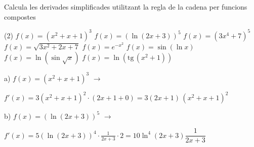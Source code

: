 \begin{mylist}
\exer[1] Calcula les derivades simplificades utilitzant la regla de la cadena per funcions compostes

\begin{tasks}(2)
	\task $f(x)=(x^2+x+1)^3$ 
	\task $f(x)=\left(\ln(2x+3)\right)^5$
	\task $f(x)=(3 x^4+7)^5$
	\task $f(x)=\sqrt{3x^2+2x+7}$
	\task $f(x)=e^{-x^2}$
	\task $f(x)=\sin \left( \ln x \right)$
	\task $f(x)=\ln (\sin \sqrt{x})$
	\task $f(x)=\ln \left( \mathrm{tg}\, (x^2+1) \right)$
\end{tasks}
\answers[cols=1]{[$y'=3(x^2+x+1)^2\,(2x+1)$, $y'=10\ln^4 (2x+3) \dfrac{1}{2x+3}$, $y'=60(3x^4+7)^4 \,x^3$, $y'=\dfrac{3x+1}{\sqrt{3x^2+2x+7}}$, $y'=-2x \,e^{-x^2}$, $y'=\cos (\ln x)\,\dfrac{1}{x}$, $y'=\dfrac{1}{2\sqrt{x}\,\tg \sqrt{x}}$, $y'=\dfrac{2x \left[1+\tg^2(x^2+1)\right]}{\tg(x^2+1)}$]}

\end{mylist}

\begin{example}
	  a)  $f(x)=(x^2+x+1)^3$ \qquad $\rightarrow$
		 
		\quad $f'(x)=3(x^2+x+1)^2 \cdot (2x+1+0) = 3(2x+1)\,(x^2+x+1)^2$
	 
		 b) $f(x)=\left(\ln(2x+3)\right)^5$	\qquad $\rightarrow$
		 
		\quad $f'(x)=5\left(\ln(2x+3)\right)^4 \cdot \frac{1}{2x+3} \cdot 2 = 10\ln^4 (2x+3) \dfrac{1}{2x+3}$	
	 
\end{example}


